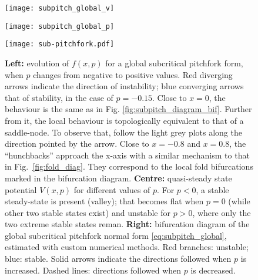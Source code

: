 \begin{figure}[h]
	\centering
	\begin{minipage}[c]{0.32\textwidth}
		\texttt{[image: subpitch\_global\_v]}
		\renewcommand{\figurename}{Fig.}
	\end{minipage}
	\hspace{0.01cm}
	\begin{minipage}[c]{0.32\textwidth}
		\texttt{[image: subpitch\_global\_p]}
		\renewcommand{\figurename}{Fig.}
	\end{minipage} 
	\hspace{0.01cm}
	\begin{minipage}[c]{0.32\textwidth}
		\texttt{[image: sub-pitchfork.pdf]}
		\renewcommand{\figurename}{Fig.}
	\end{minipage}
	
	\caption{\small \textbf{Left:} evolution of $f(x,p)$ for a global subcritical pitchfork form, when $p$ changes from negative to positive values. Red diverging arrows indicate the direction of instability; blue converging arrows that of stability, in the case of $p=-0.15$. Close to $x=0$, the behaviour is the same as in Fig. \ref{fig:subpitch_diagram_bif}. Further from it, the local behaviour is topologically equivalent to that of a saddle-node. To observe that, follow the light grey plots along the direction pointed by the arrow. Close to $x=-0.8$ and $x=0.8$, the ``hunchbacks'' approach the x-axis with a similar mechanism to that in Fig.~\ref{fig:fold_diag}. They correspond to the local fold bifurcations marked in the bifurcation diagram. \textbf{Centre:} quasi-steady state potential $V(x,p)$ for different values of $p$. For $p<0$, a stable steady-state is present (valley); that becomes flat when $p=0$ (while other two stable states exist) and unstable for $p>0$, where only the two extreme stable states reman. \textbf{Right:} bifurcation diagram of the global subcritical pitchfork normal form \ref{eq:subpitch_global}, estimated with custom numerical methods. Red branches: unstable; blue: stable. Solid arrows indicate the directions followed when $p$ is increased. Dashed lines: directions followed when $p$ is decreased.}
	\label{fig:subpitch_global}
\end{figure}





